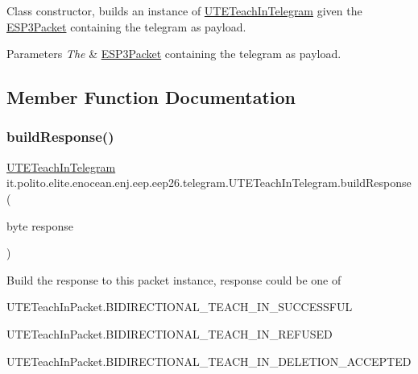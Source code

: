 Class constructor, builds an instance of \hyperlink{classit_1_1polito_1_1elite_1_1enocean_1_1enj_1_1eep_1_1eep26_1_1telegram_1_1_u_t_e_teach_in_telegram}{U\+T\+E\+Teach\+In\+Telegram} given the \hyperlink{}{E\+S\+P3\+Packet} containing the telegram as payload.


\begin{DoxyParams}{Parameters}
{\em The} & \hyperlink{}{E\+S\+P3\+Packet} containing the telegram as payload. \\
\hline
\end{DoxyParams}


\subsection{Member Function Documentation}
\hypertarget{classit_1_1polito_1_1elite_1_1enocean_1_1enj_1_1eep_1_1eep26_1_1telegram_1_1_u_t_e_teach_in_telegram_a16e78fc667d590cb7f1f31b08a5ad7e2}{}\label{classit_1_1polito_1_1elite_1_1enocean_1_1enj_1_1eep_1_1eep26_1_1telegram_1_1_u_t_e_teach_in_telegram_a16e78fc667d590cb7f1f31b08a5ad7e2} 
\subsubsection{\texorpdfstring{build\+Response()}{buildResponse()}}
{\footnotesize\ttfamily \hyperlink{classit_1_1polito_1_1elite_1_1enocean_1_1enj_1_1eep_1_1eep26_1_1telegram_1_1_u_t_e_teach_in_telegram}{U\+T\+E\+Teach\+In\+Telegram} it.\+polito.\+elite.\+enocean.\+enj.\+eep.\+eep26.\+telegram.\+U\+T\+E\+Teach\+In\+Telegram.\+build\+Response (\begin{DoxyParamCaption}\item[{byte}]{response }\end{DoxyParamCaption})}

Build the response to this packet instance, response could be one of 
\begin{DoxyItemize}
\item {\ttfamily U\+T\+E\+Teach\+In\+Packet.\+B\+I\+D\+I\+R\+E\+C\+T\+I\+O\+N\+A\+L\+\_\+\+T\+E\+A\+C\+H\+\_\+\+I\+N\+\_\+\+S\+U\+C\+C\+E\+S\+S\+F\+UL} 
\item {\ttfamily U\+T\+E\+Teach\+In\+Packet.\+B\+I\+D\+I\+R\+E\+C\+T\+I\+O\+N\+A\+L\+\_\+\+T\+E\+A\+C\+H\+\_\+\+I\+N\+\_\+\+R\+E\+F\+U\+S\+ED} 
\item {\ttfamily U\+T\+E\+Teach\+In\+Packet.\+B\+I\+D\+I\+R\+E\+C\+T\+I\+O\+N\+A\+L\+\_\+\+T\+E\+A\+C\+H\+\_\+\+I\+N\+\_\+\+D\+E\+L\+E\+T\+I\+O\+N\+\_\+\+A\+C\+C\+E\+P\+T\+ED} 
\end{DoxyItemize}


